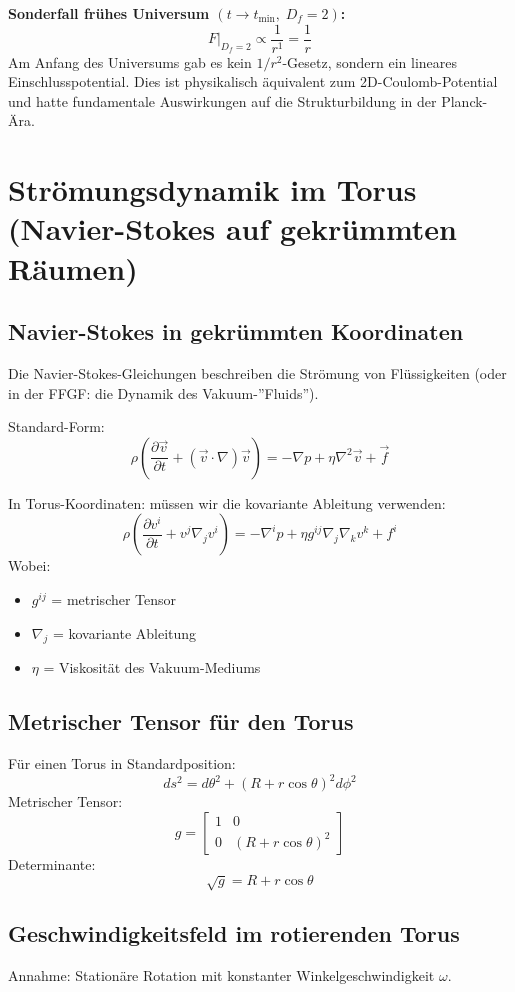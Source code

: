 	\textbf{Sonderfall frühes Universum \((t \to t_{\min},\; D_f = 2)\):}
	\[
	F\big|_{D_f=2} \propto \frac{1}{r^{1}} = \frac{1}{r}
	\]
	Am Anfang des Universums gab es kein $1/r^2$-Gesetz, sondern ein lineares Einschlusspotential. Dies ist physikalisch äquivalent zum 2D-Coulomb-Potential und hatte fundamentale Auswirkungen auf die Strukturbildung in der Planck-Ära.
	
	\section{Strömungsdynamik im Torus (Navier-Stokes auf gekrümmten Räumen)}
	\subsection{Navier-Stokes in gekrümmten Koordinaten}
	Die Navier-Stokes-Gleichungen beschreiben die Strömung von Flüssigkeiten (oder in der FFGF: die Dynamik des Vakuum-''Fluids'').
	
	Standard-Form:
	\[
	\rho\left(\frac{\partial \vec{v}}{\partial t} + (\vec{v} \cdot \nabla) \vec{v}\right) = -\nabla p + \eta \nabla^2 \vec{v} + \vec{f}
	\]
	
	In Torus-Koordinaten: müssen wir die kovariante Ableitung verwenden:
	\[
	\rho\left(\frac{\partial v^i}{\partial t} + v^j \nabla_j v^i\right) = -\nabla^i p + \eta g^{ij} \nabla_j \nabla_k v^k + f^i
	\]
	Wobei:
	\begin{itemize}
		\item \( g^{ij} \) = metrischer Tensor
		\item \( \nabla_j \) = kovariante Ableitung
		\item \( \eta \) = Viskosität des Vakuum-Mediums
	\end{itemize}
	
	\subsection{Metrischer Tensor für den Torus}
	Für einen Torus in Standardposition:
	\[
	ds^2 = d\theta^2 + (R + r \cos \theta)^2 d\phi^2
	\]
	Metrischer Tensor:
	\[
	g = \begin{bmatrix}
		1 & 0 \\
		0 & (R + r \cos \theta)^2
	\end{bmatrix}
	\]
	Determinante:
	\[
	\sqrt{g} = R + r \cos \theta
	\]
	
	\subsection{Geschwindigkeitsfeld im rotierenden Torus}
	Annahme: Stationäre Rotation mit konstanter Winkelgeschwindigkeit \( \omega \).
	
